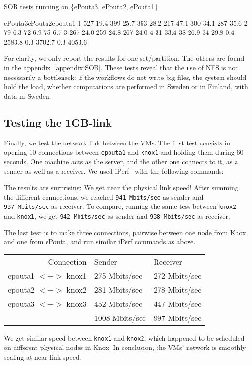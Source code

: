 \begin{table}[ht]%
\caption{SOB tests running on \{ePouta3, ePouta2, ePouta1\}}
\label{experiments:SOB:tests}
\resultpartition%
{{ePouta3}{ePouta2}{epouta1}}%
{{ 1 }{ 527 }{ 19.4   }{ 399 }{ 25.7   }{ 363 }{ 28.2   }{      }}%
{{   }{ 217 }{ 47.1   }{ 300 }{ 34.1   }{ 287 }{ 35.6   }{\hline}}%
{{ 2 }{  79 }{ 6.3    }{  72 }{ 6.9    }{  75 }{ 6.7    }{\hline}}%
{{ 3 }{ 267 }{ 24.0   }{ 259 }{ 24.8   }{ 267 }{ 24.0   }{\hline}}%
{{ 4 }{  31 }{ 33.4   }{  38 }{ 26.9   }{  34 }{ 29.8   }{      }}%
{{   }{ 0.4 }{ 2583.8 }{ 0.3 }{ 3702.7 }{ 0.3 }{ 4053.6 }{      }}
\end{table}

For clarity, we only report the results for one set/partition. The
others are found in the appendix~\ref{appendix:SOB}. These tests
reveal that the use of NFS is not necessarily a bottleneck: if the
workflows do not write big files, the system should hold the load,
whether computations are performed in Sweden or in Finland, with data
in Sweden.

\subsection{Testing the 1GB-link}
\label{section:experiments:link}

Finally, we test the network link between the VMs.
%
The first test consists in opening 10 connections between
\texttt{epouta1} and \texttt{knox1} and holding them during 60
seconds.  One machine acts as the server, and the other one connects
to it, as a sender as well as a receiver. We used iPerf~\cite{iperf}
with the following commands:


The results are surprising: We get near the physical link speed! After
summing the different connections, we reached \texttt{941\ Mbits/sec} as
sender and \texttt{937\ Mbits/sec} as receiver. To compare, running the
same test between \texttt{knox2} and \texttt{knox1}, we get
\texttt{942\ Mbits/sec} as sender and \texttt{938\ Mbits/sec} as
receiver.

The last test is to make three connections, pairwise between one node
from Knox and one from ePouta, and run similar iPerf commands as
above.

\begin{center}
\begin{tabular}{|r||l|l|}\hhline{*{3}{=}}
Connection          & Sender         & Receiver\\\hhline{*{3}{=}}
epouta1 $<->$ knox1 & 275 Mbits/sec  & 272 Mbits/sec\\
epouta2 $<->$ knox2 & 281 Mbits/sec  & 278 Mbits/sec\\
epouta3 $<->$ knox3 & 452 Mbits/sec  & 447 Mbits/sec\\\hhline{*{3}{=}}
\multicolumn{1}{r}{Total} & \multicolumn{1}{l}{1008 Mbits/sec} & \multicolumn{1}{l}{997 Mbits/sec}\\
\end{tabular}
\end{center}

We get similar speed between \texttt{knox1} and \texttt{knox2}, which
happened to be scheduled on different physical nodes in Knox.
%
In conclusion, the VMs' network is smoothly scaling at near
link-speed.
